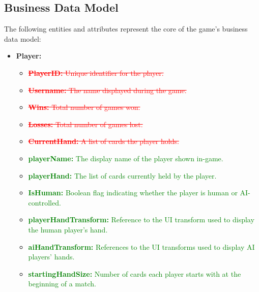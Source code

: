 \documentclass[12pt]{article}
\newcommand{\removed}[1]{\textcolor{red}{\sout{#1}}}
\newcommand{\added}[1]{\textcolor{green}{#1}}
\begin{document}
\subsection{Business Data Model}
The following entities and attributes represent the core of the game’s business data model:

\begin{itemize}
    \item \textbf{Player:}
    \begin{itemize}
        \item \removed{\textbf{PlayerID:} Unique identifier for the player.}
        \item \removed{\textbf{Username:} The name displayed during the game.}
        \item \removed{\textbf{Wins:} Total number of games won.}
        \item \removed{\textbf{Losses:} Total number of games lost.}
        \item \removed{\textbf{CurrentHand:} A list of cards the player holds.}
        \item \added{\textbf{playerName:} The display name of the player shown in-game.}
        \item \added{\textbf{playerHand:} The list of cards currently held by the player.}
        \item \added{\textbf{IsHuman:} Boolean flag indicating whether the player is human or AI-controlled.}
        \item \added{\textbf{playerHandTransform:} Reference to the UI transform used to display the human player's hand.}
        \item \added{\textbf{aiHandTransform:} References to the UI transforms used to display AI players' hands.}
        \item \added{\textbf{startingHandSize:} Number of cards each player starts with at the beginning of a match.}
    \end{itemize}


\end{itemize}
\end{document}
